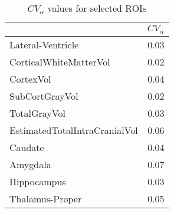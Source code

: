 \begin{table}
[]
\centering

\begin{tabular}{lr}
\toprule
{} &   $CV_{\alpha}$ \\
\midrule
Lateral-Ventricle             &  0.03 \\
CorticalWhiteMatterVol        &  0.02 \\
CortexVol                     &  0.04 \\
SubCortGrayVol                &  0.02 \\
TotalGrayVol                  &  0.03 \\
EstimatedTotalIntraCranialVol &  0.06 \\
Caudate                       &  0.04 \\
Amygdala                      &  0.07 \\
Hippocampus                   &  0.03 \\
Thalamus-Proper               &  0.05 \\
\bottomrule
\end{tabular}
\caption{$CV_{\alpha}$ values for selected ROIs}
\label{tab:cva}

\end{table}